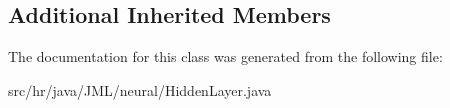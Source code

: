 \subsection*{Additional Inherited Members}


The documentation for this class was generated from the following file\+:\begin{DoxyCompactItemize}
\item 
src/hr/java/\+J\+M\+L/neural/Hidden\+Layer.\+java\end{DoxyCompactItemize}
